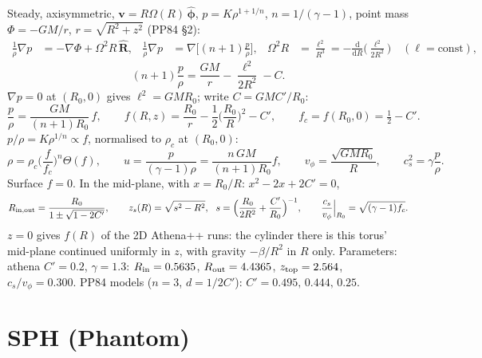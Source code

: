 \documentclass[10pt,a4paper]{article}
\newcommand{\dd}{\mathrm{d}}
\newcommand{\vv}{\mathbf{v}}
\begin{document}
Steady, axisymmetric, $\vv=R\Omega(R)\,\hat{\boldsymbol\phi}$, $p=K\rho^{1+1/n}$,
$n=1/(\gamma-1)$, point mass $\Phi=-GM/r$, $r=\sqrt{R^2+z^2}$ (PP84 \S2):
\begin{align*}
\frac{1}{\rho}\nabla p&=-\nabla\Phi+\Omega^2R\,\hat{\mathbf R},&
\frac{1}{\rho}\nabla p&=\nabla\Big[(n+1)\frac{p}{\rho}\Big],&
\Omega^2R&=\frac{\ell^2}{R^3}=-\frac{\dd}{\dd R}\Big(\frac{\ell^2}{2R^2}\Big)\quad(\ell=\text{const}),
\end{align*}
\begin{equation*}
(n+1)\frac{p}{\rho}=\frac{GM}{r}-\frac{\ell^2}{2R^2}-C .
\end{equation*}
$\nabla p=0$ at $(R_0,0)$ gives $\ell^2=GMR_0$; write $C=GMC'/R_0$:
\begin{equation}
\frac{p}{\rho}=\frac{GM}{(n+1)R_0}\,f,\qquad
f(R,z)=\frac{R_0}{r}-\frac12\Big(\frac{R_0}{R}\Big)^2-C',\qquad f_c=f(R_0,0)=\tfrac12-C'.
\end{equation}
$p/\rho=K\rho^{1/n}\propto f$, normalised to $\rho_c$ at $(R_0,0)$:
\begin{equation}
\rho=\rho_c\Big(\frac{f}{f_c}\Big)^{n}\Theta(f),\qquad
u=\frac{p}{(\gamma-1)\rho}=\frac{n\,GM}{(n+1)R_0}f,\qquad
v_\phi=\frac{\sqrt{GMR_0}}{R},\qquad
c_s^2=\gamma\frac{p}{\rho}.
\end{equation}
Surface $f=0$. In the mid-plane, with $x=R_0/R$: $x^2-2x+2C'=0$,
\begin{equation}
R_{\rm in,out}=\frac{R_0}{1\pm\sqrt{1-2C'}},\qquad
z_s(R)=\sqrt{s^2-R^2},\ \ s=\Big(\frac{R_0}{2R^2}+\frac{C'}{R_0}\Big)^{-1},\qquad
\frac{c_s}{v_\phi}\Big|_{R_0}=\sqrt{(\gamma-1)f_c}.
\end{equation}
$z=0$ gives $f(R)$ of the 2D Athena++ runs: the cylinder there is this torus' mid-plane
continued uniformly in $z$, with gravity $-\beta/R^2$ in $R$ only.
Parameters: athena $C'=0.2$, $\gamma=1.3$: $R_{\rm in}=0.5635$, $R_{\rm out}=4.4365$,
$z_{\rm top}=2.564$, $c_s/v_\phi=0.300$. PP84 models ($n=3$, $d=1/2C'$):
$C'=0.495,\,0.444,\,0.25$.

\section{SPH (Phantom)}
\end{document}
